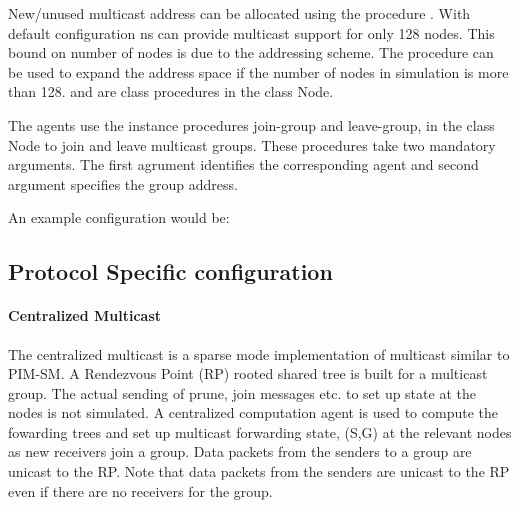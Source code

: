 New/unused multicast address can be allocated using the procedure
. With default configuration ns can provide multicast
support for only 128 nodes. This bound on number of nodes is due to
the addressing scheme. The procedure  can be used to
expand the address space if the number of nodes in simulation is more
than 128.  and  are class
procedures in the class Node.


The agents use the instance procedures join-group and leave-group, in
the class Node to join and leave multicast groups. These procedures
take two mandatory arguments. The first agrument identifies the
corresponding agent and second argument specifies the group address.


An example configuration would be:

\subsection{Protocol Specific configuration}

\paragraph{Centralized Multicast}
The centralized multicast is a sparse mode implementation of multicast
similar to PIM-SM. A Rendezvous Point (RP) rooted shared tree is built
for a multicast group.  The actual sending of prune, join messages
etc. to set up state at the nodes is not simulated.  A centralized
computation agent is used to compute the fowarding trees and set up
multicast forwarding state, (S,G) at the relevant nodes as new
receivers join a group.  Data packets from the senders to a group are
unicast to the RP.  Note that data packets from the senders are
unicast to the RP even if there are no receivers for the group.

